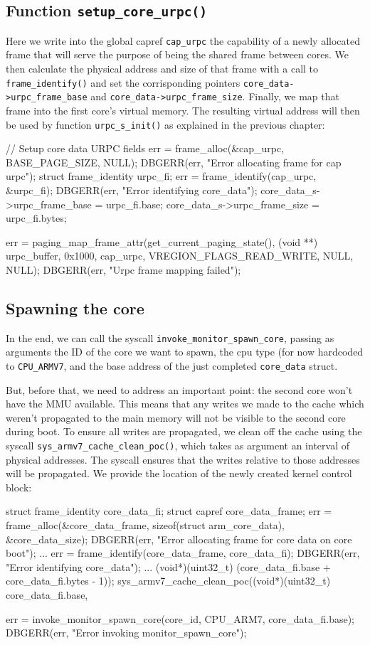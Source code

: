 \documentclass[a4paper,twoside,openright]{report}
\renewcommand{\t}[1]{%
	{\texttt{#1}}}
\begin{document}
\subsection{Function \t{setup\_core\_urpc()}}
Here we write into the global capref \t{cap\_urpc} the capability of a newly
allocated frame that will serve the purpose of being the shared frame between cores.
We then calculate the physical address and size of that frame with a call to
\t{frame\_identify()} and set the corrisponding pointers
\t{core\_data->urpc\_frame\_base} and \t{core\_data->urpc\_frame\_size}.
Finally, we map that frame into the first core's virtual memory. The resulting
virtual address will then be used by function \t{urpc\_s\_init()} as explained
in the previous chapter:
\begin{pandacode}
// Setup core data URPC fields
err = frame_alloc(&cap_urpc, BASE_PAGE_SIZE, NULL);
DBGERR(err, "Error allocating frame for cap urpc\n");
struct frame_identity urpc_fi;
err = frame_identify(cap_urpc, &urpc_fi);
DBGERR(err, "Error identifying core_data\n");
core_data_s->urpc_frame_base    = urpc_fi.base;
core_data_s->urpc_frame_size    = urpc_fi.bytes;

err = paging_map_frame_attr(get_current_paging_state(), 
	(void **) urpc_buffer, 0x1000,
cap_urpc, VREGION_FLAGS_READ_WRITE, NULL, NULL);
DBGERR(err, "Urpc frame mapping failed");
\end{pandacode}



\subsection{Spawning the core}
In the end, we can call the syscall \t{invoke\_monitor\_spawn\_core}, passing as
arguments the ID of the core we want to spawn, the cpu type (for now hardcoded to
\t{CPU\_ARMV7}, and the base address of the just completed \t{core\_data} struct.

But, before that, we need to address an important point: the second core won't have the
MMU available. This means that any writes we made to the cache which weren't propagated
to the main memory will not be visible to the second core during boot. 
To ensure all writes are propagated, we clean off the cache using the 
syscall \t{sys\_armv7\_cache\_clean\_poc()}, which takes as argument an interval of 
physical addresses. The syscall ensures that the writes relative to those addresses will
be propagated. We provide the location of the newly created kernel control block:
\begin{pandacode}
struct frame_identity core_data_fi;
struct capref core_data_frame; 
err = frame_alloc(&core_data_frame, sizeof(struct arm_core_data), &core_data_size);
DBGERR(err, "Error allocating frame for core data on core boot\n");
...
err = frame_identify(core_data_frame, core_data_fi);
DBGERR(err, "Error identifying core_data\n");
...
(void*)(uint32_t) (core_data_fi.base + core_data_fi.bytes - 1));
sys_armv7_cache_clean_poc((void*)(uint32_t) core_data_fi.base, 

err = invoke_monitor_spawn_core(core_id, CPU_ARM7, core_data_fi.base);
DBGERR(err, "Error invoking monitor_spawn_core\n");
\end{pandacode}
\end{document}
